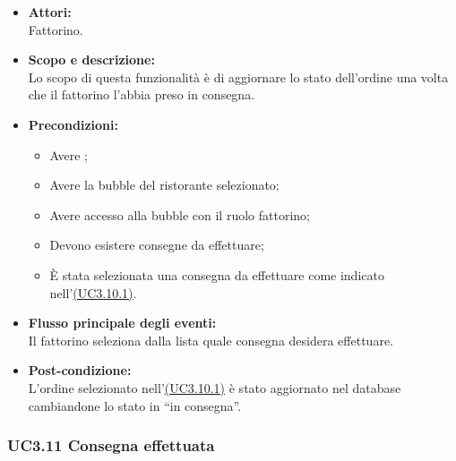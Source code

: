 \begin{itemize}
	\item \textbf{Attori:}
	\\Fattorino.
	\item \textbf{Scopo e descrizione:} 
	\\Lo scopo di questa funzionalità è di aggiornare lo stato dell'ordine una volta che il fattorino l'abbia preso in consegna.
	\item \textbf{Precondizioni:}
	\begin{itemize}
		\item Avere ;
		\item Avere la bubble del ristorante selezionato;
		\item Avere accesso alla bubble con il ruolo fattorino;
		\item Devono esistere consegne da effettuare;
		\item È stata selezionata una consegna da effettuare come indicato nell’\hyperref[UC3.10.1]{(UC3.10.1)}.
	\end{itemize}
	\item \textbf{Flusso principale degli eventi:}
	\\Il fattorino seleziona dalla lista quale consegna desidera effettuare.
	\item \textbf{Post-condizione:}
	\\L'ordine selezionato nell’\hyperref[UC3.10.1]{(UC3.10.1)} è stato aggiornato nel database cambiandone lo stato in “in consegna”.
\end{itemize}

\subsubsection{UC3.11 Consegna effettuata} \label{UC3.11}

